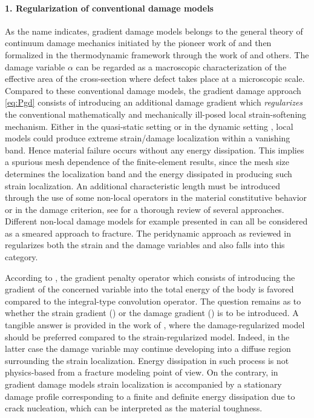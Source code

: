 \paragraph{1. Regularization of conventional damage models} As the name indicates, gradient damage models belongs to the general theory of continuum damage mechanics initiated by the pioneer work of \cite{Kachanov:1958} and then formalized in the thermodynamic framework through the work of \cite{LemaitreChaboche:1978} and others. The damage variable $\alpha$ can be regarded as a macroscopic characterization of the effective area of the cross-section where defect takes place at a microscopic scale. Compared to these conventional damage models, the gradient damage approach \eqref{eq:Pgd} consists of introducing an additional damage gradient which \emph{regularizes} the conventional mathematically and mechanically ill-posed local strain-softening mechanism. Either in the quasi-static setting \cite{Benallal:1993} or in the dynamic setting \cite{Bazant:1985aa}, local models could produce extreme strain/damage localization within a vanishing band. Hence material failure occurs without any energy dissipation. This implies a spurious mesh dependence of the finite-element results, since the mesh size determines the localization band and the energy dissipated in producing such strain localization. An additional characteristic length must be introduced through the use of some non-local operators in the material constitutive behavior or in the damage criterion, see \cite{VreeBrekelmansGils:1995,Jirasek:1998,Peerlings:2001aa,LorentzAndrieux:2003} for a thorough review of several approaches. Different non-local damage models for example presented in \cite{PeerlingsBorstBrekelmansVree:1996,PeerlingsBorstBrekelmansGeers:1998,Comi:1999,Comi:2001,Peerlings:2001aa,LorentzAndrieux:2003,BorstRemmersNeedlemanAbellan:2004} can all be considered as a smeared approach to fracture. The peridynamic approach as reviewed in \cite{Silling:2010aa} regularizes both the strain and the damage variables and also falls into this category.

According to \cite{LorentzAndrieux:2003}, the gradient penalty operator which consists of introducing the gradient of the concerned variable into the total energy of the body is favored compared to the integral-type convolution operator. The question remains as to whether the strain gradient (\cite{PeerlingsBorstBrekelmansVree:1996}) or the damage gradient (\cite{LorentzBenallal:2005,PhamAmorMarigoMaurini:2011}) is to be introduced. A tangible answer is provided in the work of \cite{LeMauriniMarigoVidoli:2015}, where the damage-regularized model should be preferred compared to the strain-regularized model. Indeed, in the latter case the damage variable may continue developing into a diffuse region surrounding the strain localization. Energy dissipation in such process is not physics-based from a fracture modeling point of view. On the contrary, in gradient damage models strain localization is accompanied by a stationary damage profile corresponding to a finite and definite energy dissipation due to crack nucleation, which can be interpreted as the material toughness.


